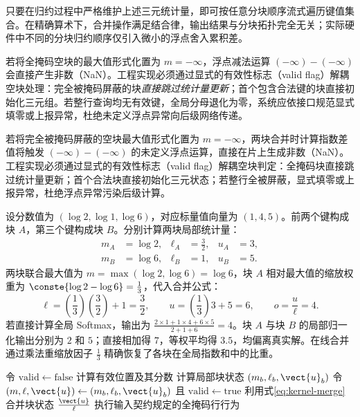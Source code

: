 \documentclass[../textbook.tex]{subfiles}
\begin{document}
只要在归约过程中严格维护上述三元统计量，即可按任意分块顺序流式遍历键值集合。在精确算术下，合并操作满足结合律，输出结果与分块拓扑完全无关；实际硬件中不同的分块归约顺序仅引入微小的浮点舍入累积差。

若将全掩码空块的最大值形式化置为 $m=-\infty$，浮点减法运算 $(-\infty)-(-\infty)$ 会直接产生非数（NaN）。工程实现必须通过显式的有效性标志（valid flag）解耦空块处理：完全被掩码屏蔽的块\emph{直接跳过统计量更新}；首个包含合法键的块直接初始化三元组。若整行查询均无有效键，全局分母退化为零，系统应依接口规范显式填零或上报异常，杜绝未定义浮点异常向后级网络传递。

\begin{warning}
若将完全被掩码屏蔽的空块最大值形式化置为 $m=-\infty$，两块合并时计算指数差值将触发 $(-\infty)-(-\infty)$ 的未定义浮点运算，直接在片上生成非数（NaN）。工程实现必须通过显式的有效性标志（valid flag）解耦空块判定：全掩码块直接跳过统计量更新；首个合法块直接初始化三元状态；若整行全被屏蔽，显式填零或上报异常，杜绝浮点异常污染后级计算。
\end{warning}

\begin{example}
设分数值为 $(\log2,\log1,\log6)$，对应标量值向量为 $(1,4,5)$。前两个键构成块 $A$，第三个键构成块 $B$。分别计算两块局部统计量：
\begin{align*}
 m_A&=\log2,&\ell_A&=\frac{3}{2},&u_A&=3,\\
 m_B&=\log6,&\ell_B&=1,&u_B&=5.
\end{align*}
两块联合最大值为 $m=\max(\log2,\log6)=\log6$，块 $A$ 相对最大值的缩放权重为 $\conste{\log2-\log6}=\frac{1}{3}$，代入合并公式：
\begin{equation*}
 \ell=\left(\frac{1}{3}\right)\left(\frac{3}{2}\right)+1=\frac{3}{2},\qquad u=\left(\frac{1}{3}\right)3+5=6,\qquad o=\frac{u}{\ell}=4.
\end{equation*}
若直接计算全局 Softmax，输出为 $\frac{2\times 1+1\times 4+6\times 5}{2+1+6}=4$。块 $A$ 与块 $B$ 的局部归一化输出分别为 $2$ 和 $5$；直接相加得 $7$，等权平均得 $3.5$，均偏离真实解。在线合并通过乘法重缩放因子 $\frac{1}{3}$ 精确恢复了各块在全局指数和中的比重。
\end{example}

\begin{algorithm}[单查询的分块精确注意力]
\begin{myalgorithmic}[1]
\State 令 $\mathrm{valid}\gets\mathrm{false}$
  \State 计算有效位置及其分数
    \State 计算局部块状态 $(m_b,\ell_b,\vect{u}_b)$
      \State 令 $(m,\ell,\vect{u})\gets(m_b,\ell_b,\vect{u}_b)$ 且 $\mathrm{valid}\gets\mathrm{true}$
    \Else
      \State 利用式\eqref{eq:kernel-merge}合并块状态
    \EndIf
  \EndIf
\EndFor
{}
  \State \Return $\frac{\vect{u}}{\ell}$
\Else
  \State 执行输入契约规定的全掩码行行为
\EndIf
\end{myalgorithmic}
\end{algorithm}
\end{document}
